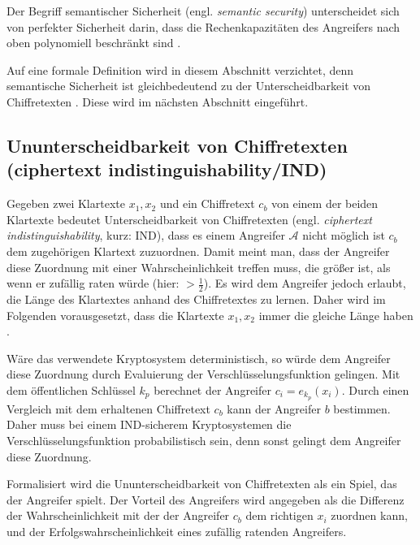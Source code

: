 Der Begriff semantischer Sicherheit (engl. \textit{semantic security}) unterscheidet sich von perfekter Sicherheit darin, dass die Rechenkapazitäten des Angreifers nach oben polynomiell beschränkt sind \cite[p.290]{smart2003}
\cite[p.166]{buchmann2004introduction}.

Auf eine formale Definition wird in diesem Abschnitt verzichtet, denn semantische Sicherheit ist gleichbedeutend zu der Unterscheidbarkeit von Chiffretexten \cite[p.8]{goldreich1993uniform}\cite[p.203]{delfs2002introduction}. Diese wird im nächsten Abschnitt eingeführt.

\subsection[Ununterscheidbarkeit von Chiffretexten (ciphertext indistinguishability/IND)]{\texorpdfstring{Ununterscheidbarkeit von Chiffretexten\\ (ciphertext indistinguishability/IND)}{Ununterscheidbarkeit von Chiffretexten (ciphertext indistinguishability/IND)}}
\label{IND}

Gegeben zwei Klartexte $x_1, x_2$ und ein Chiffretext $c_b$ von einem der beiden Klartexte bedeutet Unterscheidbarkeit von Chiffretexten (engl. \textit{ciphertext indistinguishability}, kurz: IND), dass es einem Angreifer $\mathcal{A}$ nicht möglich ist $c_b$ dem zugehörigen Klartext zuzuordnen. Damit meint man, dass der Angreifer diese Zuordnung mit einer Wahrscheinlichkeit treffen muss, die größer ist, als wenn er zufällig raten würde (hier: $>\frac{1}{2}$). Es wird dem Angreifer jedoch erlaubt, die Länge des Klartextes anhand des Chiffretextes zu lernen. Daher wird im Folgenden vorausgesetzt, dass die Klartexte $x_1, x_2$ immer die gleiche Länge haben \cite[p.32]{bellare1998relations}. 

Wäre das verwendete Kryptosystem deterministisch, so würde dem Angreifer diese Zuordnung durch Evaluierung der Verschlüsselungsfunktion gelingen. Mit dem öffentlichen Schlüssel $k_p$ berechnet der Angreifer $c_i = e_{k_p}(x_i)$. Durch einen Vergleich mit dem erhaltenen Chiffretext $c_b$ kann der Angreifer $b$ bestimmen. Daher muss bei einem IND-sicherem Kryptosystemen die Verschlüsselungsfunktion probabilistisch sein, denn sonst gelingt dem Angreifer diese Zuordnung.

Formalisiert wird die Ununterscheidbarkeit von Chiffretexten als ein Spiel, das der Angreifer spielt. Der Vorteil des Angreifers wird angegeben als die Differenz der Wahrscheinlichkeit mit der der Angreifer $c_b$ dem richtigen $x_i$ zuordnen kann, und der Erfolgswahrscheinlichkeit eines zufällig ratenden Angreifers.

